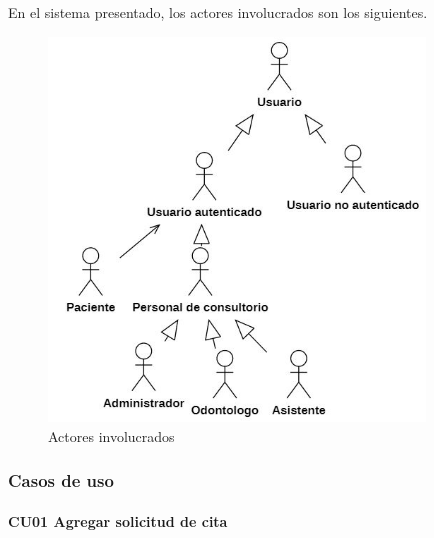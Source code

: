 En el sistema presentado, los actores involucrados son los siguientes.

\begin{figure}[H]
\centering
\includegraphics[width=10cm, keepaspectratio]{pictures/actores.JPG}
\caption{Actores involucrados}
\end{figure}

\newpage
\subsubsection{Casos de uso}



\paragraph{CU01 Agregar solicitud de cita}

